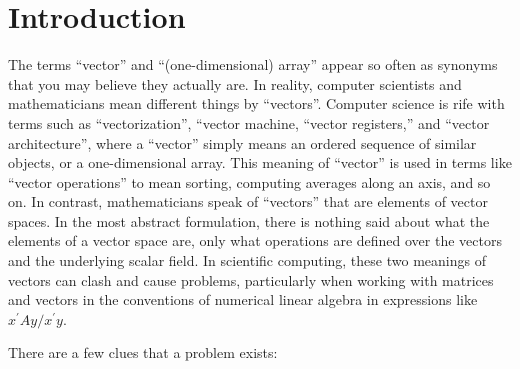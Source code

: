 \section{Introduction}

The terms ``vector'' and ``(one-dimensional) array'' appear so often as
synonyms that you may believe they actually are. In reality, computer
scientists and mathematicians mean different things by ``vectors''.  Computer
science is rife with terms such as ``vectorization'', ``vector machine,
``vector registers,'' and ``vector architecture'', where a ``vector''
simply means an ordered sequence of similar objects, or a one-dimensional
array. This meaning of ``vector'' is used in terms like ``vector operations''
to mean sorting, computing averages along an axis, and so on.
In contrast, mathematicians speak of ``vectors'' that are elements of
vector spaces. In the most abstract formulation, there is nothing said about
what the elements of a vector space are, only what operations are defined over
the vectors and the underlying scalar field.
In scientific computing, these two meanings of vectors can clash and cause
problems, particularly when working with matrices and vectors in the
conventions of numerical linear algebra in expressions like
$x^\prime Ay/x^\prime y$.

There are a few clues that a problem exists:


